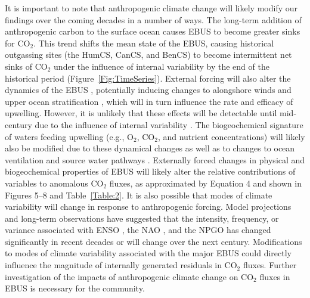 \documentclass[hvmath, online,bgd]{copernicus_discussions}
\begin{document}
It is important to note that anthropogenic climate change will likely modify our findings over the coming decades in a number of ways. The long-term addition of anthropogenic carbon to the surface ocean causes EBUS to become greater sinks for CO$_{2}$. This trend shifts the mean state of the EBUS, causing historical outgassing sites (the HumCS, CanCS, and BenCS) to become intermittent net sinks of CO$_{2}$ under the influence of internal variability by the end of the historical period (Figure~\ref{Fig:TimeSeries}). External forcing will also alter the dynamics of the EBUS \citep{Bakun:2015, Garcia-Reyes:2015}, potentially inducing changes to alongshore winds \citep{Narayan:2010,Sydeman:2014,Oerder:2015, Ryk:2015, Wang:2015} and upper ocean stratification \citep{DiLorenzo:2005, Ryk:2010, Oerder:2015}, which will in turn influence the rate and efficacy of upwelling. However, it is unlikely that these effects will be detectable until mid-century due to the influence of internal variability \citep{Brady:2017}. The biogeochemical signature of waters feeding upwelling (e.g., O$_{2}$, CO$_{2}$, and nutrient concentrations) will likely also be modified due to these dynamical changes as well as to changes to ocean ventilation and source water pathways \citep{Ryk:2010}. Externally forced changes in physical and biogeochemical properties of EBUS will likely alter the relative contributions of variables to anomalous CO$_{2}$ fluxes, as approximated by Equation 4 and shown in Figures 5--8 and Table~\ref{Table:2}. It is also possible that modes of climate variability will change in response to anthropogenic forcing. Model projections and long-term observations have suggested that the intensity, frequency, or variance associated with ENSO \citep[e.g.,][]{Timmermann:1999, Cai:2014, Cai:2015}, the NAO \citep{Kuzmina:2005}, and the NPGO \citep{Sydeman:2013} has changed significantly in recent decades or will change over the next century. Modifications to modes of climate variability associated with the major EBUS could directly influence the magnitude of internally generated residuals in CO$_{2}$ fluxes. Further investigation of the impacts of anthropogenic climate change on CO$_{2}$ fluxes in EBUS is necessary for the community.
\end{document}
